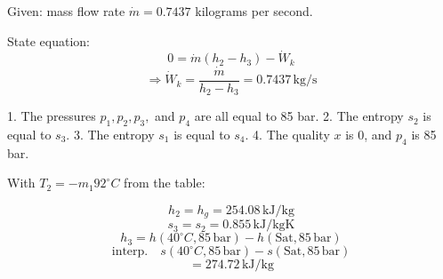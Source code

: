 Given: mass flow rate \( \dot{m} = 0.7437 \) kilograms per second.

State equation:
\[
0 = \dot{m}(h_2 - h_3) - \dot{W}_k
\]
\[
\Rightarrow \dot{W}_k = \frac{\dot{m}}{h_2 - h_3} = 0.7437 \, \text{kg/s}
\]

1. The pressures \( p_1, p_2, p_3, \) and \( p_4 \) are all equal to 85 bar.
2. The entropy \( s_2 \) is equal to \( s_3 \).
3. The entropy \( s_1 \) is equal to \( s_4 \).
4. The quality \( x \) is 0, and \( p_4 \) is 85 bar.

With \( T_2 = -m_1 92^\circ C \) from the table:

\[
h_2 = h_g = 254.08 \, \text{kJ/kg}
\]
\[
s_3 = s_2 = 0.855 \, \text{kJ/kgK}
\]
\[
h_3 = h(40^\circ C, 85 \, \text{bar}) - h(\text{Sat}, 85 \, \text{bar})
\]
\[
\text{interp.} \quad s(40^\circ C, 85 \, \text{bar}) - s(\text{Sat}, 85 \, \text{bar})
\]
\[
= 274.72 \, \text{kJ/kg}
\]